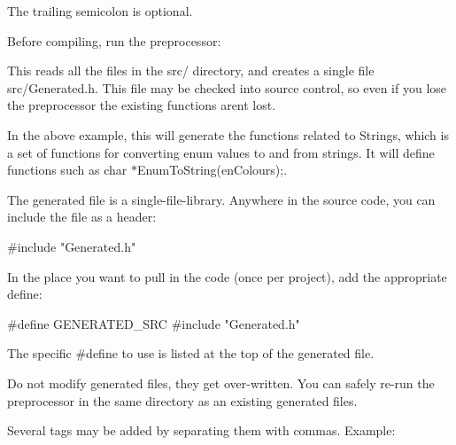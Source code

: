 The trailing semicolon is optional.

Before compiling, run the preprocessor\+:




This reads all the files in the {\ttfamily src/} directory, and creates a single file {\ttfamily src/\+Generated.\+h}. This file may be checked into source control, so even if you lose the preprocessor the existing functions aren\textquotesingle{}t lost.

In the above example, this will generate the functions related to \textquotesingle{}Strings\textquotesingle{}, which is a set of functions for converting enum values to and from strings. It will define functions such as {\ttfamily char $\ast$\+Enum\+To\+String(en\+Colours);}.

The generated file is a single-\/file-\/library. Anywhere in the source code, you can include the file as a header\+:


\begin{DoxyCode}
\textcolor{preprocessor}{#include "Generated.h"}
\end{DoxyCode}


In the place you want to pull in the code (once per project), add the appropriate define\+:


\begin{DoxyCode}
\textcolor{preprocessor}{#define GENERATED\_SRC}
\textcolor{preprocessor}{#include "Generated.h"}
\end{DoxyCode}
 The specific {\ttfamily \#define} to use is listed at the top of the generated file.

Do not modify generated files, they get over-\/written. You can safely re-\/run the preprocessor in the same directory as an existing generated files.

Several tags may be added by separating them with commas. Example\+:


